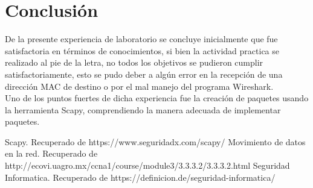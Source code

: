 \documentclass[spanish]{udpreport}
\begin{document}
\chapter{Conclusión}
De la presente experiencia de laboratorio se concluye inicialmente que fue satisfactoria en términos de conocimientos, si bien la actividad practica se realizado al pie de la letra, no todos los objetivos se pudieron cumplir satisfactoriamente, esto se pudo deber a algún error en la recepción de una dirección MAC de destino o por el mal manejo del programa Wireshark.
\\ Uno de los puntos fuertes de dicha experiencia fue la creación de paquetes usando la herramienta Scapy, comprendiendo la manera adecuada de implementar paquetes. 
\begin{thebibliography}{0}
Scapy. Recuperado de https://www.seguridadx.com/scapy/
Movimiento de datos en la red. Recuperado de http://ecovi.uagro.mx/ccna1/course/module3/3.3.3.2/3.3.3.2.html
Seguridad Informatica. Recuperado de https://definicion.de/seguridad-informatica/
\end{thebibliography}
\listoffigures
\end{document}
